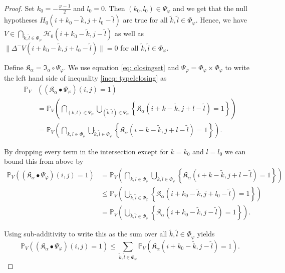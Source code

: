 \documentclass[a4paper,12pt]{article}
\newcommand{\norm}[1]{\lVert#1\rVert}
\theoremstyle{plain}
\theoremstyle{definition}
\begin{document}
\begin{proof}
	Set $k_0 = -\frac{\varphi - 1}{2}$ and $l_0 = 0$. Then $(k_0, l_0) \in \Psi_\varphi$ and we get that the null hypotheses $H_0(i + k_0 - \tilde{k}, j + l_0 - \tilde{l})$ are true for all $\tilde{k}, \tilde{l} \in \Phi_\varphi$. Hence, we have $V \in \bigcap_{\tilde{k}, \tilde{l} \in \Phi_\varphi} \mathcal{H}_0(i + k_0 - \tilde{k}, j - \tilde{l})$ as well as $\norm{\Delta^- V(i + k_0 - \tilde{k}, j + l_0 - \tilde{l})} = 0$ for all $\tilde{k}, \tilde{l} \in \Phi_\varphi$.
	
	Define $\mathfrak{K}_\alpha = \mathfrak{I}_\alpha \circ \Psi_\varphi$. We use equation \eqref{eq: closingset} and $\Psi_\varphi = \Phi_\varphi \times \Phi_\varphi$ to write the left hand side of inequality \eqref{ineq: typeIclosing} as
	\begin{align*}
		\mathbb{P}_V&\left( (\mathfrak{K}_\alpha \bullet \Psi_\varphi)(i, j) = 1 \right) \\
		&= \mathbb{P}_V\left( \bigcap_{(k, l) \in \Psi_\varphi} \bigcup_{(\tilde{k}, \tilde{l}) \in \Psi_\varphi} \left\{ \mathfrak{K}_\alpha(i + k - \tilde{k}, j + l - \tilde{l}) = 1 \right\} \right) \\
		&= \mathbb{P}_V\left( \bigcap_{k, l \in \Phi_\varphi} \bigcup_{\tilde{k}, \tilde{l} \in \Phi_\varphi} \left\{ \mathfrak{K}_\alpha(i + k - \tilde{k}, j + l - \tilde{l}) = 1 \right\} \right).
	\end{align*}
	
	By dropping every term in the intersection except for $k = k_0$ and $l = l_0$ we can bound this from above by
	\begin{align*}
		\mathbb{P}_V\left( (\mathfrak{K}_\alpha \bullet \Psi_\varphi)(i, j) = 1 \right) &= \mathbb{P}_V\left( \bigcap_{k, l \in \Phi_\varphi} \bigcup_{\tilde{k}, \tilde{l} \in \Phi_\varphi} \left\{ \mathfrak{K}_\alpha(i + k - \tilde{k}, j + l - \tilde{l}) = 1 \right\} \right) \\
		&\leq \mathbb{P}_V\left( \bigcup_{\tilde{k}, \tilde{l} \in \Phi_\varphi} \left\{ \mathfrak{K}_\alpha(i + k_0 - \tilde{k}, j + l_0 - \tilde{l}) = 1 \right\} \right) \\
		&= \mathbb{P}_V\left( \bigcup_{\tilde{k}, \tilde{l} \in \Phi_\varphi} \left\{ \mathfrak{K}_\alpha(i + k_0 - \tilde{k}, j - \tilde{l}) = 1 \right\} \right).
	\end{align*}
	
	Using sub-additivity to write this as the sum over all $\tilde{k}, \tilde{l} \in \Phi_\varphi$ yields
	\begin{equation*}
		\mathbb{P}_V\left( (\mathfrak{K}_\alpha \bullet \Psi_\varphi)(i, j) = 1 \right) \leq \sum_{\tilde{k}, \tilde{l} \in \Phi_\varphi} \mathbb{P}_V\left( \mathfrak{K}_\alpha(i + k_0 - \tilde{k}, j - \tilde{l}) = 1 \right).
	\end{equation*}
	

\end{proof}
\end{document}
